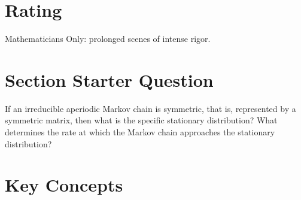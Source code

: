 \documentclass[12pt]{article}
\begin{document}
\myheader \mytitle

\hr


\hr

\usefirefox



\section*{Rating} %
Mathematicians Only:  prolonged scenes of intense rigor.

\hr

\section*{Section Starter Question}

If an irreducible aperiodic Markov chain is symmetric, that is,
represented by a symmetric matrix, then what is the specific stationary
distribution? What determines the rate at which the Markov chain
approaches the stationary distribution?

\hr

\section*{Key Concepts}
\end{document}
